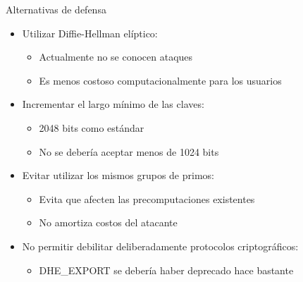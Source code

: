 \documentclass{beamer}
\begin{document}
\begin{frame}{Alternativas de defensa}
    \begin{itemize}
        \item Utilizar Diffie-Hellman elíptico:
            \begin{itemize}
                \item Actualmente no se conocen ataques
                \item Es menos costoso computacionalmente para los usuarios
            \end{itemize}
        \item Incrementar el largo mínimo de las claves:
            \begin{itemize}
                \item 2048 bits como estándar
                \item No se debería aceptar menos de 1024 bits
            \end{itemize}
        \item Evitar utilizar los mismos grupos de primos:
            \begin{itemize}
                \item Evita que afecten las precomputaciones existentes
                \item No amortiza costos del atacante
            \end{itemize}
        \item No permitir debilitar deliberadamente protocolos criptográficos:
            \begin{itemize}
                \item DHE\_EXPORT se debería haber deprecado hace bastante
            \end{itemize}
    \end{itemize}
\end{frame}


% 
% 
\end{document}
